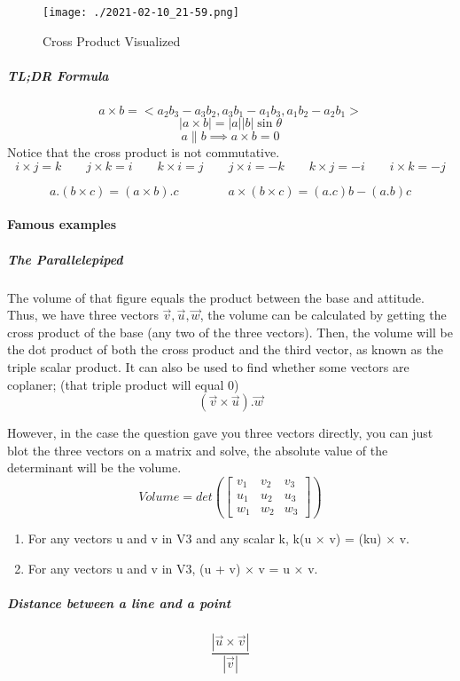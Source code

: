 \documentclass{article}
\begin{document}
\begin{figure}[h!]
	\texttt{[image: ./2021-02-10\_21-59.png]}
	\caption{Cross Product Visualized}
\end{figure}

\subparagraph{TL;DR Formula}
\[
	a\times b = <a_2b_3-a_3b_2,a_3b_1-a_1b_3,a_1b_2-a_2b_1> 
\]
\[
	|a\times b|
	= |a||b| \sin{ \theta } 
\]
\[
	a \parallel b \implies a \times b = 0 
\]
Notice that the cross product is not commutative.
\[
	i \times j = k  \qquad j \times k = i \qquad k \times i = j \qquad j \times i = -k \qquad k \times j = -i \qquad i \times k = -j 
\]

\[
	a . (b \times c) = (a \times b) . c \qquad \qquad a \times (b \times c ) = (a.c)b - (a.b)c 
\]

\newpage

\paragraph{Famous examples}
\subparagraph{The Parallelepiped}
The volume of that figure equals the product between the base and attitude. Thus, we have three vectors $ \vec{ v }, \vec{ u }, \vec{ w } $, the volume can be calculated by getting the cross product of the base (any two of the three vectors). Then, the volume will be the dot product of both the cross product and the third vector, as known as the triple scalar product.
It can also be used to find whether some vectors are coplaner; (that triple product will equal 0)
\begin{equation*}
	( \vec{ v } \times \vec{ u } ) . \vec{ w }
\end{equation*}

However, in the case the question gave you three vectors directly, you can just blot the three vectors on a matrix and solve, the absolute value of the determinant will be the volume.
\begin{equation*}
	Volume = det \left( \left [
		\begin{matrix}
			v_1&v_2&v_3\\u_1&u_2&u_3\\w_1&w_2&w_3
		\end{matrix}
		\right]
	\right)
\end{equation*}

\begin{enumerate}[1.]
	\item For any vectors u and v in V3 and any scalar k, k(u × v) = (ku) × v.
\item For any vectors u and v in V3, (u + v) × v = u × v.
 
\end{enumerate}
\subparagraph{Distance between a line and a point}
\[
	\frac{| \vec{ u } \times \vec{ v }| }{ | \vec{ v } | } 
\]
\end{document}

